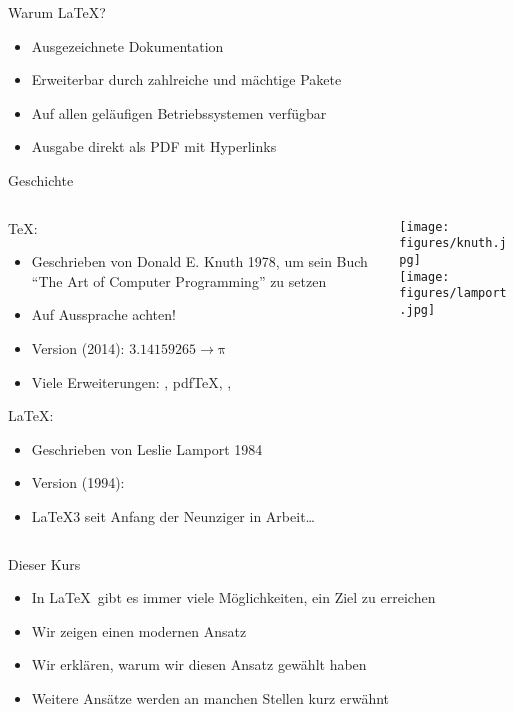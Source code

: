 \begin{frame}{Warum \LaTeX?}
  \Large
  \linespread{1.5}
  \begin{itemize}
    \item Ausgezeichnete Dokumentation
    \item Erweiterbar durch zahlreiche und mächtige Pakete
    \item Auf allen geläufigen Betriebssystemen verfügbar
    \item Ausgabe direkt als PDF mit Hyperlinks
  \end{itemize}
  \linespread{1.0}
\end{frame}

\begin{frame}{Geschichte}
  \begin{columns}
    \begin{column}{0.73\textwidth}
      \TeX:
      \begin{itemize}
        \item Geschrieben von Donald E. Knuth 1978, um sein Buch \enquote{The Art of Computer Programming} zu setzen
        \item Auf Aussprache achten!
        \item Version (2014): $3.14159265 → \mathup{π}$
        \item Viele Erweiterungen: \eTeX, pdf\TeX, \XeTeX, \LuaTeX
      \end{itemize}

      \vspace{10pt}
      \LaTeX:
      \begin{itemize}
        \item Geschrieben von Leslie Lamport 1984
        \item Version (1994): \LaTeXe
        \item \LaTeX3 seit Anfang der Neunziger in Arbeit…
      \end{itemize}
    \end{column}
    \begin{column}{0.23\textwidth}
      \texttt{[image: figures/knuth.jpg]}\\
      \texttt{[image: figures/lamport.jpg]}
    \end{column}
  \end{columns}
\end{frame}

\begin{frame}{Dieser Kurs}
  \Large
  \linespread{1.5}
  \begin{itemize}
    \item In \LaTeX\ gibt es immer viele Möglichkeiten, ein Ziel zu erreichen
    \item Wir zeigen einen modernen Ansatz
    \item Wir erklären, warum wir diesen Ansatz gewählt haben
    \item Weitere Ansätze werden an manchen Stellen kurz erwähnt
  \end{itemize}
  \linespread{1.0}
\end{frame}

